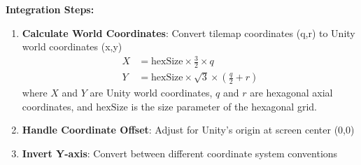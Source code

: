 \documentclass[english]{tudscrreprt}
\begin{document}
\textbf{Integration Steps:}
\begin{enumerate}
  \item \textbf{Calculate World Coordinates}: Convert tilemap coordinates (q,r) to Unity world coordinates (x,y)
    \begin{align}
      X &= \text{hexSize} \times \frac{3}{2} \times q \\
      Y &= \text{hexSize} \times \sqrt{3} \times \left(\frac{q}{2} + r\right)
    \end{align}
    where $X$ and $Y$ are Unity world coordinates, $q$ and $r$ are hexagonal axial coordinates, and $\text{hexSize}$ is the size parameter of the hexagonal grid.
  \item \textbf{Handle Coordinate Offset}: Adjust for Unity's origin at screen center (0,0)
  \item \textbf{Invert Y-axis}: Convert between different coordinate system conventions
\end{enumerate}
\end{document}
